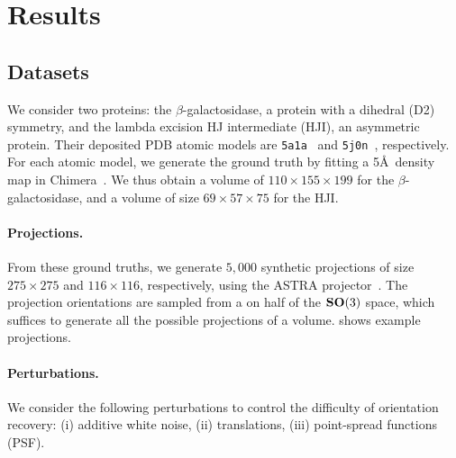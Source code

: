 \section{Results}

\subsection{Datasets}\label{sec:results:data}


We consider two proteins: the $\beta$-galactosidase, a protein with a dihedral (D2) symmetry, and the lambda excision HJ intermediate (HJI), an asymmetric protein.
Their deposited PDB atomic models are \texttt{5a1a}~\cite{bartesaghi2015betagal} and \texttt{5j0n}~\cite{laxmikanthan2016structure}, respectively.
For each atomic model, we generate the ground truth by fitting a 5\AA\ density map in Chimera~\cite{pettersen2004ucsf}.
We thus obtain a volume of $110 \times 155 \times 199$  for the $\beta$-galactosidase, and a volume of size $69 \times 57 \times 75$ for the HJI.

\paragraph{Projections.}
From these ground truths, we generate $5,000$ synthetic projections of size $275\times 275$ and $116\times 116$, respectively, using the ASTRA projector~\cite{van2015astra}.
The projection orientations are sampled from a   on half of the $\mathrm{\mathbf{SO}}(3)$ space, which suffices to generate all the possible projections of a volume.
 shows example projections.

\paragraph{Perturbations.}
We consider the following perturbations to control the difficulty of orientation recovery: (i) additive white noise, (ii) translations, (iii) point-spread functions (PSF).

